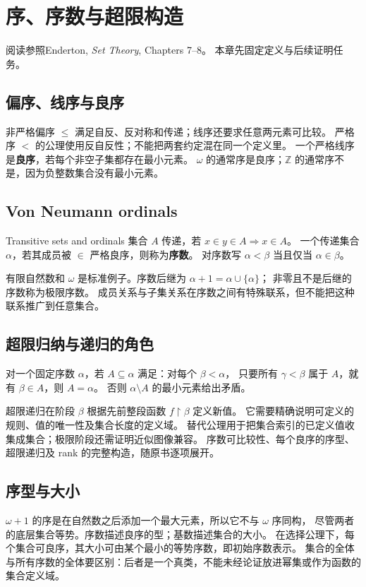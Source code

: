 \chapter{序、序数与超限构造}
\begin{qlnote}{阅读参照}Enderton, \emph{Set Theory}, Chapters 7--8。
本章先固定定义与后续证明任务。\end{qlnote}

\section{偏序、线序与良序}
非严格偏序 \(\le\) 满足自反、反对称和传递；线序还要求任意两元素可比较。
严格序 \(<\) 的公理使用反自反性；不能把两套约定混在同一个定义里。
一个严格线序是\textbf{良序}，若每个非空子集都存在最小元素。
\(\omega\) 的通常序是良序；\(\mathbb Z\) 的通常序不是，因为负整数集合没有最小元素。

\section{Von Neumann ordinals}
\begin{definition}{Transitive sets and ordinals}
集合 \(A\) 传递，若 \(x\in y\in A\Rightarrow x\in A\)。
一个传递集合 \(\alpha\)，若其成员被 \(\in\) 严格良序，则称为\textbf{序数}。
对序数写 \(\alpha<\beta\) 当且仅当 \(\alpha\in\beta\)。
\end{definition}
有限自然数和 \(\omega\) 是标准例子。序数后继为 \(\alpha+1=\alpha\cup\{\alpha\}\)；
非零且不是后继的序数称为极限序数。
成员关系与子集关系在序数之间有特殊联系，但不能把这种联系推广到任意集合。

\section{超限归纳与递归的角色}
对一个固定序数 \(\alpha\)，若 \(A\subseteq\alpha\) 满足：对每个 \(\beta<\alpha\)，
只要所有 \(\gamma<\beta\) 属于 \(A\)，就有 \(\beta\in A\)，则 \(A=\alpha\)。
否则 \(\alpha\setminus A\) 的最小元素给出矛盾。

超限递归在阶段 \(\beta\) 根据先前整段函数 \(f\restriction\beta\) 定义新值。
它需要精确说明可定义的规则、值的唯一性及集合长度的定义域。
替代公理用于把集合索引的已定义值收集成集合；极限阶段还需证明近似图像兼容。
序数可比较性、每个良序的序型、超限递归及 rank 的完整构造，随原书逐项展开。

\section{序型与大小}
\(\omega+1\) 的序是在自然数之后添加一个最大元素，所以它不与 \(\omega\) 序同构，
尽管两者的底层集合等势。序数描述良序的型；基数描述集合的大小。
在选择公理下，每个集合可良序，其大小可由某个最小的等势序数，即初始序数表示。
集合的全体与所有序数的全体要区别：后者是一个真类，不能未经论证放进幂集或作为函数的集合定义域。
